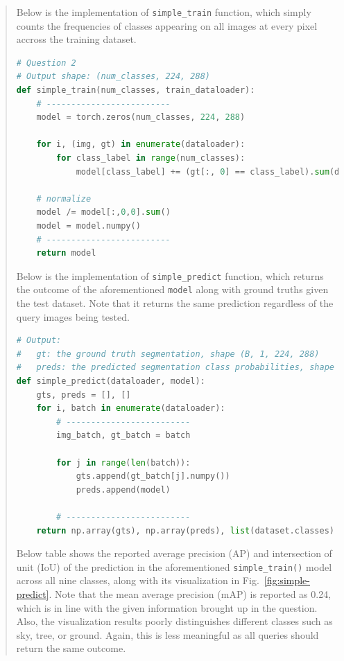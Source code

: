 \documentclass[9pt]{article}
\begin{document}
\begin{quote}

Below is the implementation of \texttt{simple\_train} function, which simply counts the frequencies of classes appearing on all images at every pixel accross the training dataset.

\begin{lstlisting}[language=Python, basicstyle=\scriptsize]
# Question 2
# Output shape: (num_classes, 224, 288)
def simple_train(num_classes, train_dataloader):
    # -------------------------
    model = torch.zeros(num_classes, 224, 288)

    for i, (img, gt) in enumerate(dataloader):
        for class_label in range(num_classes):
            model[class_label] += (gt[:, 0] == class_label).sum(dim=0)

    # normalize
    model /= model[:,0,0].sum()
    model = model.numpy()
    # -------------------------
    return model
\end{lstlisting}

Below is the implementation of \texttt{simple\_predict} function, which returns the outcome of the aforementioned \texttt{model} along with ground truths given the test dataset. Note that it returns the same prediction regardless of the query images being tested.

\begin{lstlisting}[language=Python, basicstyle=\scriptsize]
# Output:
#   gt: the ground truth segmentation, shape (B, 1, 224, 288)
#   preds: the predicted segmentation class probabilities, shape (B, 9, 224, 288) 
def simple_predict(dataloader, model):
    gts, preds = [], []
    for i, batch in enumerate(dataloader):
        # -------------------------
        img_batch, gt_batch = batch
        
        for j in range(len(batch)):
            gts.append(gt_batch[j].numpy())
            preds.append(model)
        
        # -------------------------
    return np.array(gts), np.array(preds), list(dataset.classes)
\end{lstlisting}

Below table shows the reported average precision (AP) and intersection of unit (IoU) of the prediction in the aforementioned \texttt{simple\_train()} model across all nine classes, along with its visualization in Fig.~\ref{fig:simple-predict}. Note that the mean average precision (mAP) is reported as 0.24, which is in line with the given information brought up in the question. Also, the visualization results poorly distinguishes different classes such as sky, tree, or ground. Again, this is less meaningful as all queries should return the same outcome.


\end{quote}
\end{document}
